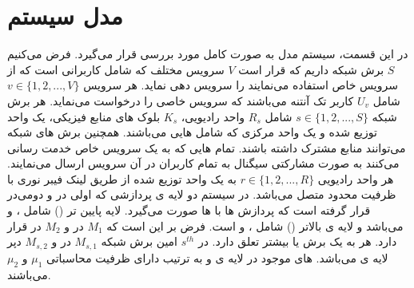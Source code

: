 \section{مدل سیستم}
در این قسمت، سیستم مدل به صورت کامل مورد بررسی قرار می‌گیرد.
فرض می‌کنیم $S$ برش شبکه داریم که قرار است $V$ سرویس مختلف که شامل کاربرانی است که از سرویس خاص استفاده می‌نمایند را سرویس دهی نماید.
هر سرویس 
$v\in \{1,2,...,V \} $
شامل 
$U_v$
کاربر تک آنتنه می‌باشند که سرویس خاصی را درخواست می‌نماید.
هر برش شبکه 
$s \in \{1,2,...,S \}$
شامل 
$R_s$
واحد رادیویی،
$K_s$
بلوک های منابع فیزیکی، یک واحد توزیع شده و یک واحد مرکزی که شامل  هایی می‌باشند.
همچنین برش های شبکه می‌توانند منابع مشترک داشته باشند.
تمام هایی که به یک سرویس خاص خدمت رسانی می‌کنند به صورت مشارکتی سیگنال به تمام کاربران در آن سرویس ارسال می‌نمایند. 
\cite{motalleb2017optimal,mimoCran}
هر واحد رادیویی
$r \in \{1,2,...,R \}$
به یک واحد توزیع شده از طریق لینک فیبر نوری با ظرفیت  
محدود متصل می‌باشد.
در سیستم 
دو لایه ی پردازشی که اولی در  و دومی‌در  قرار گرفته است که پردازش ها با  ها صورت می‌گیرد.
لایه پایین تر () شامل 
،
و 
می‌باشد و 
لایه ی بالاتر 
()
شامل 
،
و 
است.
فرض بر این است که $M_1$
در 
و 
$M_2$
در  قرار دارد.
هر  به یک برش یا بیشتر تعلق دارد.
در $s^{th}$ امین برش شبکه $M_{s,1}$ 
در 
و 
$M_{s,2}$
دپر لایه ی  می‌باشد.
های موجود در لایه ی  و  به ترتیب دارای ظرفیت محاسباتی 
$\mu_1$ 
و
 $\mu_2$
می‌باشند.
